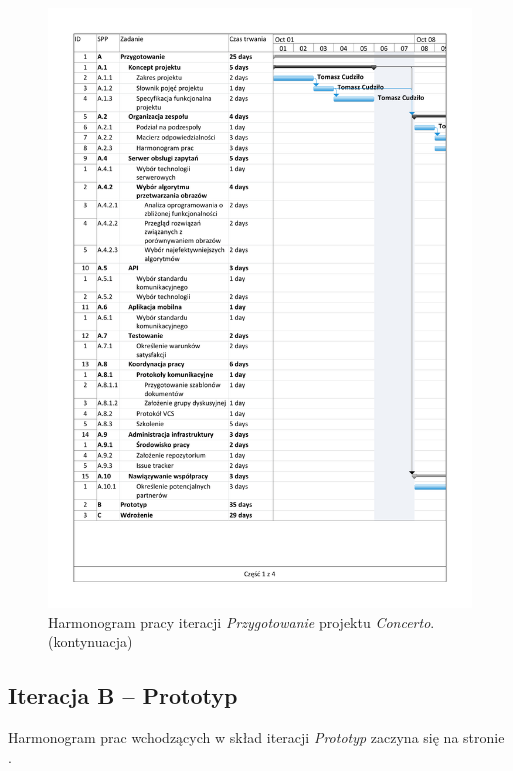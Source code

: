 \documentclass[10pt]{dokument-ppi}
\begin{document}
\begin{figure}[p]
    \ContinuedFloat
    \includegraphics[trim=1.2cm 1.2cm 1.2cm 1.2cm,page=4,width=\textwidth]{./figury/organizacja-pracy-A-przygotowanie}
    \caption[]{Harmonogram pracy iteracji \emph{Przygotowanie} projektu \emph{Concerto}. (kontynuacja)}
\end{figure}

\subsection{Iteracja B -- Prototyp}

Harmonogram prac wchodzących w skład iteracji \emph{Prototyp}
zaczyna się na stronie \pageref{fig:iteracja-prototyp}.
\end{document}
